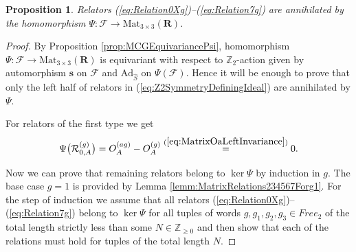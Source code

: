 \documentclass{amsart}
\newtheorem{proposition}[theorem]{Proposition}
\newcommand{\R}{\mathcal R}
\begin{document}
\begin{proposition}
    Relators (\ref{eq:Relation0Xg})--(\ref{eq:Relation7g}) are annihilated by the homomorphism $\Psi:\mathcal F\rightarrow\mathrm{Mat}_{3\times3}(\mathbf R)$.
\label{prop:SevenRelationsAnnihilated}
\end{proposition}
\begin{proof}
By Proposition \ref{prop:MCGEquivariancePsi}, homomorphism $\Psi:\mathcal F\rightarrow\mathrm{Mat}_{3\times3}(\mathbf R)$ is equivariant with respect to $\mathbb Z_2$-action given by automorphism $\mathbf s$ on $\mathcal F$ and $\mathrm{Ad}_{\widehat S}$ on $\Psi(\mathcal F)$. Hence it will be enough to prove that only the left half of relators in (\ref{eq:Z2SymmetryDefiningIdeal}) are annihilated by $\Psi$.

For relators of the first type we get
\begin{equation*}
\Psi\big(\R_{0,A}^{(g)}\big)=O_A^{(ag)}-O_A^{(g)}\overset{(\ref{eq:MatrixOaLeftInvariance})}{=}0.
\end{equation*}

Now we can prove that remaining relators belong to $\ker\Psi$ by induction in $g$. The base case $g=1$ is provided by Lemma \ref{lemm:MatrixRelations234567Forg1}. For the step of induction we assume that all relators (\ref{eq:Relation0Xg})--(\ref{eq:Relation7g}) belong to $\ker\Psi$ for all tuples of words $g,g_1,g_2,g_3\in Free_2$ of the total length strictly less than some $N\in\mathbb Z_{\geq0}$ and then show that each of the relations must hold for tuples of the total length $N$.


\end{proof}
\end{document}
